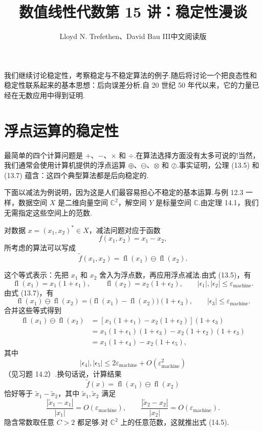 \documentclass[UTF8,fontset=none,12pt]{ctexart}
\title{数值线性代数\quad 第 15 讲：稳定性漫谈}
\author{Lloyd N. Trefethen、David Bau III\quad 中文阅读版}
\date{}
\newcommand{\C}{\mathbb{C}}
\newcommand{\epsmach}{\varepsilon_{\mathrm{machine}}}
\newcommand{\fl}{\operatorname{fl}}
\theoremstyle{definition}
\begin{document}
\maketitle
\pagestyle{plain}

我们继续讨论稳定性，考察稳定与不稳定算法的例子.随后将讨论一个把良态性和稳定性联系起来的基本思想：后向误差分析.自 20 世纪 50 年代以来，它的力量已经在无数应用中得到证明.

\section*{浮点运算的稳定性}

最简单的四个计算问题是 $+$、$-$、$\times$ 和 $\div$.在算法选择方面没有太多可说的!当然，我们通常会使用计算机提供的浮点运算 $\oplus$、$\ominus$、$\otimes$ 和 $\oslash$.事实证明，公理 (13.5) 和 (13.7) 蕴含：这四个典型算法都是后向稳定的.

下面以减法为例说明，因为这是人们最容易担心不稳定的基本运算.与例 12.3 一样，数据空间 $X$ 是二维向量空间 $\C^2$，解空间 $Y$ 是标量空间 $\C$.由定理 14.1，我们无需指定这些空间上的范数.

对数据 $x=(x_1,x_2)^*\in X$，减法问题对应于函数
\[
    f(x_1,x_2)=x_1-x_2,
\]
所考虑的算法可以写成
\begin{equation*}
    \widetilde f(x_1,x_2)=\fl(x_1)\ominus\fl(x_2).
\end{equation*}

这个等式表示：先把 $x_1$ 和 $x_2$ 舍入为浮点数，再应用浮点减法.由式 (13.5)，有
\[
    \fl(x_1)=x_1(1+\epsilon_1),
    \qquad
    \fl(x_2)=x_2(1+\epsilon_2),
    \qquad
    |\epsilon_1|,|\epsilon_2|\le\epsmach.
\]
由式 (13.7)，有
\[
    \fl(x_1)\ominus\fl(x_2)
    =\bigl(\fl(x_1)-\fl(x_2)\bigr)(1+\epsilon_3),
    \qquad
    |\epsilon_3|\le\epsmach.
\]
合并这些等式得到
\begin{align*}
    \fl(x_1)\ominus\fl(x_2)
    &=[x_1(1+\epsilon_1)-x_2(1+\epsilon_2)](1+\epsilon_3)\\
    &=x_1(1+\epsilon_1)(1+\epsilon_3)
      -x_2(1+\epsilon_2)(1+\epsilon_3)\\
    &=x_1(1+\epsilon_4)-x_2(1+\epsilon_5),
\end{align*}
其中
\[
    |\epsilon_4|,|\epsilon_5|
    \le 2\epsmach+O(\epsmach^2)
\]
（见习题 14.2）.换句话说，计算结果
\[
    \widetilde f(x)=\fl(x_1)\ominus\fl(x_2)
\]
恰好等于 $\widetilde x_1-\widetilde x_2$，其中 $\widetilde x_1,\widetilde x_2$ 满足
\[
    \frac{|\widetilde x_1-x_1|}{|x_1|}
    =O(\epsmach),
    \qquad
    \frac{|\widetilde x_2-x_2|}{|x_2|}
    =O(\epsmach).
\]
隐含常数取任意 $C>2$ 都足够.对 $\C^2$ 上的任意范数，这就推出式 (14.5).
\end{document}
